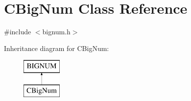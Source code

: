 \hypertarget{class_c_big_num}{}\section{C\+Big\+Num Class Reference}
\label{class_c_big_num}


{\ttfamily \#include $<$bignum.\+h$>$}

Inheritance diagram for C\+Big\+Num\+:\begin{figure}[H]
\begin{center}
\leavevmode
\includegraphics[height=2.000000cm]{class_c_big_num}
\end{center}
\end{figure}
